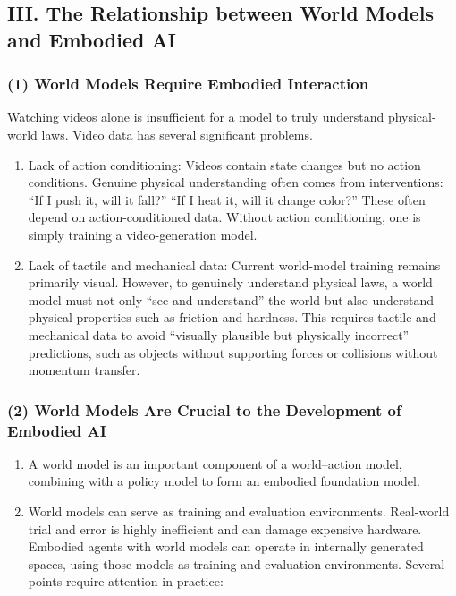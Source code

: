 \hypertarget{iii.-the-relationship-between-world-models-and-embodied-ai}{%
\subsection{III. The Relationship between World Models and Embodied AI}\label{iii.-the-relationship-between-world-models-and-embodied-ai}}

\hypertarget{world-models-require-embodied-interaction}{%
\subsubsection{(1) World Models Require Embodied Interaction}\label{world-models-require-embodied-interaction}}

Watching videos alone is insufficient for a model to truly understand physical-world laws. Video data has several significant problems.

\begin{enumerate}
\def\labelenumi{\arabic{enumi}.}
\item
  Lack of action conditioning: Videos contain state changes but no action conditions. Genuine physical understanding often comes from interventions: ``If I push it, will it fall?'' ``If I heat it, will it change color?'' These often depend on action-conditioned data. Without action conditioning, one is simply training a video-generation model.
\item
  Lack of tactile and mechanical data: Current world-model training remains primarily visual. However, to genuinely understand physical laws, a world model must not only ``see and understand'' the world but also understand physical properties such as friction and hardness. This requires tactile and mechanical data to avoid ``visually plausible but physically incorrect'' predictions, such as objects without supporting forces or collisions without momentum transfer.
\end{enumerate}

\hypertarget{world-models-are-crucial-to-the-development-of-embodied-ai}{%
\subsubsection{(2) World Models Are Crucial to the Development of Embodied AI}\label{world-models-are-crucial-to-the-development-of-embodied-ai}}

\begin{enumerate}
\def\labelenumi{\arabic{enumi}.}
\item
  A world model is an important component of a world--action model, combining with a policy model to form an embodied foundation model.
\item
  World models can serve as training and evaluation environments. Real-world trial and error is highly inefficient and can damage expensive hardware. Embodied agents with world models can operate in internally generated spaces, using those models as training and evaluation environments. Several points require attention in practice:
\end{enumerate}

